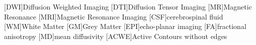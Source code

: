 
[DWI]{Diffusion Weighted Imaging}
[DTI]{Diffusion Tensor Imaging}
[MR]{Magnetic Resonance}
[MRI]{Magnetic Resonance Imaging}
[CSF]{cerebrospinal fluid}
[WM]{White Matter}
[GM]{Grey Matter}
[EPI]{echo-planar imaging}
[FA]{fractional anisotropy}
[MD]{mean diffusivity}
[ACWE]{Active Contours without edges}